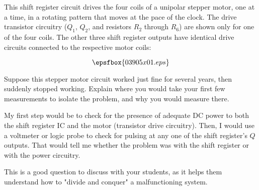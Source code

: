 

This shift register circuit drives the four coils of a unipolar stepper motor, one at a time, in a rotating pattern that moves at the pace of the clock.  The drive transistor circuitry ($Q_1$, $Q_2$, and resistors $R_2$ through $R_6$) are shown only for one of the four coils.  The other three shift register outputs have identical drive circuits connected to the respective motor coils:

$$\epsfbox{03905x01.eps}$$

Suppose this stepper motor circuit worked just fine for several years, then suddenly stopped working.  Explain where you would take your first few measurements to isolate the problem, and why you would measure there.







My first step would be to check for the presence of adequate DC power to both the shift register IC and the motor (transistor drive circuitry).  Then, I would use a voltmeter or logic probe to check for pulsing at any one of the shift register's $Q$ outputs.  That would tell me whether the problem was with the shift register or with the power circuitry.







This is a good question to discuss with your students, as it helps them understand how to "divide and conquer" a malfunctioning system.




